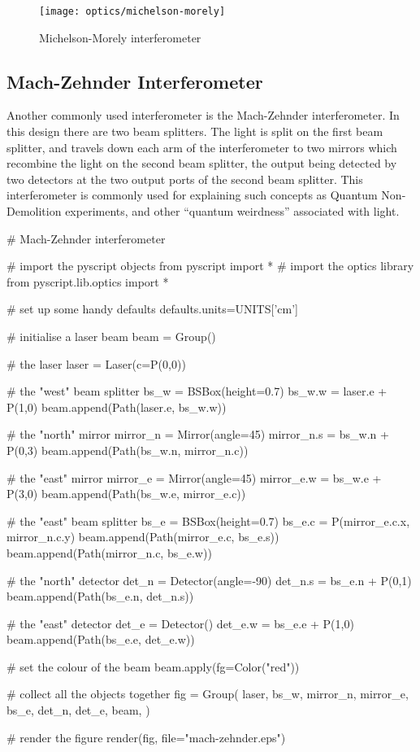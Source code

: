 \begin{figure}[ht]
\centerline{\texttt{[image: optics/michelson-morely]}}
\caption{Michelson-Morely interferometer}
\label{fig:michelson-morely}
\end{figure}

\subsection{Mach-Zehnder Interferometer}

Another commonly used interferometer is the Mach-Zehnder interferometer.  In
this design there are two beam splitters.  The light is split on the first
beam splitter, and travels down each arm of the interferometer to two
mirrors which recombine the light on the second beam splitter, the output
being detected by two detectors at the two output ports of the second beam
splitter.  This interferometer is commonly used for explaining such concepts
as Quantum Non-Demolition experiments, and other ``quantum weirdness''
associated with light.

\begin{python}
# Mach-Zehnder interferometer

# import the pyscript objects
from pyscript import *
# import the optics library
from pyscript.lib.optics import *

# set up some handy defaults
defaults.units=UNITS['cm']

# initialise a laser beam
beam = Group()

# the laser
laser = Laser(c=P(0,0))

# the "west" beam splitter
bs_w = BSBox(height=0.7)
bs_w.w = laser.e + P(1,0)
beam.append(Path(laser.e, bs_w.w))

# the "north" mirror
mirror_n = Mirror(angle=45)
mirror_n.s = bs_w.n + P(0,3)
beam.append(Path(bs_w.n, mirror_n.c))

# the "east" mirror
mirror_e = Mirror(angle=45)
mirror_e.w = bs_w.e + P(3,0)
beam.append(Path(bs_w.e, mirror_e.c))

# the "east" beam splitter
bs_e = BSBox(height=0.7)
bs_e.c = P(mirror_e.c.x, mirror_n.c.y)
beam.append(Path(mirror_e.c, bs_e.s))
beam.append(Path(mirror_n.c, bs_e.w))

# the "north" detector
det_n = Detector(angle=-90)
det_n.s = bs_e.n + P(0,1)
beam.append(Path(bs_e.n, det_n.s))

# the "east" detector
det_e = Detector()
det_e.w = bs_e.e + P(1,0)
beam.append(Path(bs_e.e, det_e.w))

# set the colour of the beam
beam.apply(fg=Color("red"))

# collect all the objects together
fig = Group(
        laser,
        bs_w,
        mirror_n, mirror_e,
        bs_e,
        det_n, det_e,
        beam,
        )

# render the figure
render(fig,
        file="mach-zehnder.eps")
\end{python}

